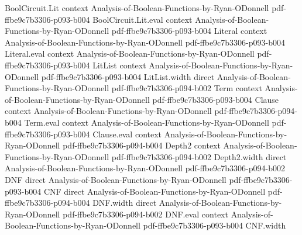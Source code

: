 \begin{lemma}
\leanok
{}
\proofstep
  {BoolCircuit.Lit}
  {context}
  {Analysis-of-Boolean-Functions-by-Ryan-ODonnell}
  {pdf-ffbe9c7b3306-p093-b004}
\proofstep
  {BoolCircuit.Lit.eval}
  {context}
  {Analysis-of-Boolean-Functions-by-Ryan-ODonnell}
  {pdf-ffbe9c7b3306-p093-b004}
\proofstep
  {Literal}
  {context}
  {Analysis-of-Boolean-Functions-by-Ryan-ODonnell}
  {pdf-ffbe9c7b3306-p093-b004}
\proofstep
  {Literal.eval}
  {context}
  {Analysis-of-Boolean-Functions-by-Ryan-ODonnell}
  {pdf-ffbe9c7b3306-p093-b004}
\proofstep
  {LitList}
  {context}
  {Analysis-of-Boolean-Functions-by-Ryan-ODonnell}
  {pdf-ffbe9c7b3306-p093-b004}
\proofstep
  {LitList.width}
  {direct}
  {Analysis-of-Boolean-Functions-by-Ryan-ODonnell}
  {pdf-ffbe9c7b3306-p094-b002}
\proofstep
  {Term}
  {context}
  {Analysis-of-Boolean-Functions-by-Ryan-ODonnell}
  {pdf-ffbe9c7b3306-p093-b004}
\proofstep
  {Clause}
  {context}
  {Analysis-of-Boolean-Functions-by-Ryan-ODonnell}
  {pdf-ffbe9c7b3306-p094-b004}
\proofstep
  {Term.eval}
  {context}
  {Analysis-of-Boolean-Functions-by-Ryan-ODonnell}
  {pdf-ffbe9c7b3306-p093-b004}
\proofstep
  {Clause.eval}
  {context}
  {Analysis-of-Boolean-Functions-by-Ryan-ODonnell}
  {pdf-ffbe9c7b3306-p094-b004}
\proofstep
  {Depth2}
  {context}
  {Analysis-of-Boolean-Functions-by-Ryan-ODonnell}
  {pdf-ffbe9c7b3306-p094-b002}
\proofstep
  {Depth2.width}
  {direct}
  {Analysis-of-Boolean-Functions-by-Ryan-ODonnell}
  {pdf-ffbe9c7b3306-p094-b002}
\proofstep
  {DNF}
  {direct}
  {Analysis-of-Boolean-Functions-by-Ryan-ODonnell}
  {pdf-ffbe9c7b3306-p093-b004}
\proofstep
  {CNF}
  {direct}
  {Analysis-of-Boolean-Functions-by-Ryan-ODonnell}
  {pdf-ffbe9c7b3306-p094-b004}
\proofstep
  {DNF.width}
  {direct}
  {Analysis-of-Boolean-Functions-by-Ryan-ODonnell}
  {pdf-ffbe9c7b3306-p094-b002}
\proofstep
  {DNF.eval}
  {context}
  {Analysis-of-Boolean-Functions-by-Ryan-ODonnell}
  {pdf-ffbe9c7b3306-p093-b004}
\proofstep
  {CNF.width}

\end{lemma}

